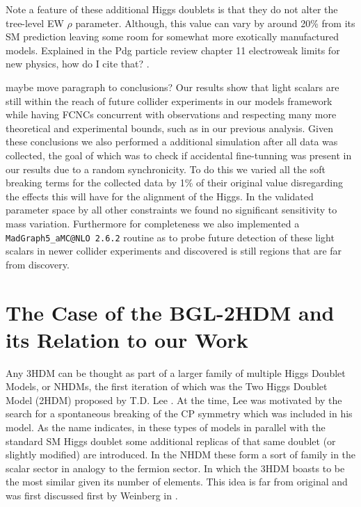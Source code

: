 Note a feature of these additional Higgs doublets is that they do not alter the tree-level EW $\rho$ parameter. 
%
Although, this value can vary by around 20\% from its SM prediction leaving some room for somewhat more exotically manufactured models.  { \color{blue} Explained in the Pdg particle review chapter 11 electroweak limits for new physics, how do I cite that? }. 

{ \color{blue} maybe move paragraph to conclusions? } 
Our results show that light scalars are still within the reach of future collider experiments in our models framework while having FCNCs concurrent with observations and respecting many more theoretical and experimental bounds, such as in our previous analysis. 
%
Given these conclusions we also performed a additional simulation after all data was collected, the goal of which was to check if accidental fine-tunning was present in our results due to a random synchronicity.
%
To do this we varied all the soft breaking terms for the collected data by 1\% of their original value disregarding the effects this will have for the alignment of the Higgs. 
%
In the validated parameter space by all other constraints we found no significant sensitivity to mass variation.  
%
Furthermore for completeness we also implemented a \texttt{MadGraph5\_aMC@NLO 2.6.2} routine as to probe future detection of these light scalars in newer collider experiments and discovered  is still regions that are far from discovery.  

\section{The Case of the BGL-2HDM and its Relation to our Work}


Any 3HDM can be thought as part of a larger family of multiple Higgs Doublet Models, or NHDMs, the first iteration of which was the Two Higgs Doublet Model (2HDM) proposed by T.D. Lee \cite{Lee1973}.   
%
At the time, Lee was motivated by the search for a spontaneous breaking of the CP symmetry which was included in his model.  
%
As the name indicates, in these types of models in parallel with the standard SM Higgs doublet some additional replicas of that same doublet (or slightly modified) are introduced. 
%
In the NHDM these form a sort of family in the scalar sector in analogy to the fermion sector.
%
In which the 3HDM boasts to be the most similar given its number of elements.
%
This idea is far from original and was first discussed first by Weinberg in \Joaoout{,} \cite{Weinberg1976}.

